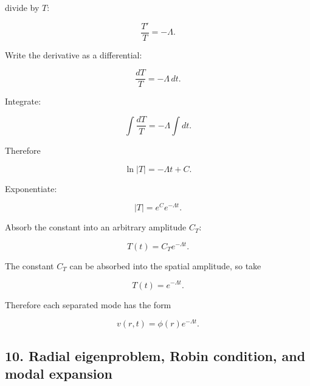 \documentclass[11pt,a4paper]{article}
\begin{document}
divide by $T$:

\begin{equation}
\frac{T'}{T}=-\Lambda.
\tag{TRISO-ANA-245}
\label{eq:triso-ana-245}
\end{equation}

Write the derivative as a differential:

\begin{equation}
\frac{dT}{T}=-\Lambda\,dt.
\tag{TRISO-ANA-246}
\label{eq:triso-ana-246}
\end{equation}

Integrate:

\begin{equation}
\int\frac{dT}{T}
=
-\Lambda\int dt.
\tag{TRISO-ANA-247}
\label{eq:triso-ana-247}
\end{equation}

Therefore

\begin{equation}
\ln|T|
=
-\Lambda t+C.
\tag{TRISO-ANA-248}
\label{eq:triso-ana-248}
\end{equation}

Exponentiate:

\begin{equation}
|T|=e^{C}e^{-\Lambda t}.
\tag{TRISO-ANA-249}
\label{eq:triso-ana-249}
\end{equation}

Absorb the constant into an arbitrary amplitude $C_T$:

\begin{equation}
T(t)=C_Te^{-\Lambda t}.
\tag{TRISO-ANA-250}
\label{eq:triso-ana-250}
\end{equation}

The constant $C_T$ can be absorbed into the spatial amplitude, so take

\begin{equation}
\boxed{
T(t)=e^{-\Lambda t}.
}
\tag{TRISO-ANA-251}
\label{eq:triso-ana-251}
\end{equation}

Therefore each separated mode has the form

\begin{equation}
v(r,t)=\phi(r)e^{-\Lambda t}.
\tag{TRISO-ANA-252}
\label{eq:triso-ana-252}
\end{equation}

\subsection*{10. Radial eigenproblem, Robin condition, and modal expansion}
\end{document}
